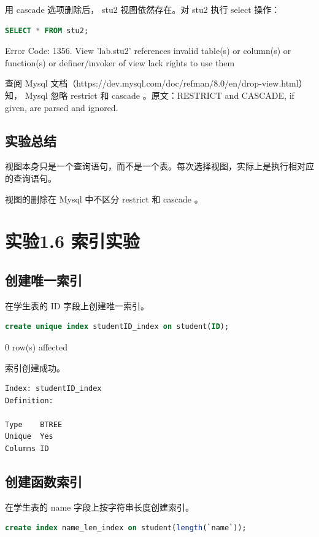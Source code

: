 \documentclass{article}
\begin{document}
用 cascade 选项删除后， stu2 视图依然存在。对 stu2 执行 select 操作：

\begin{lstlisting}[language=sql]
SELECT * FROM stu2;
\end{lstlisting}

Error Code: 1356. View 'lab.stu2' references invalid table(s) or column(s) or function(s) or definer/invoker of view lack rights to use them


查阅 Mysql 文档（https://dev.mysql.com/doc/refman/8.0/en/drop-view.html）知， Mysql 忽略 restrict 和 cascade 。原文：RESTRICT and CASCADE, if given, are parsed and ignored.

\subsection{实验总结}

视图本身只是一个查询语句，而不是一个表。每次选择视图，实际上是执行相对应的查询语句。

视图的删除在 Mysql 中不区分 restrict 和 cascade 。

\section{实验1.6 索引实验}

\subsection{创建唯一索引}

在学生表的 ID 字段上创建唯一索引。

\begin{lstlisting}[language=sql]
create unique index studentID_index on student(ID);
\end{lstlisting}

0 row(s) affected

索引创建成功。

\begin{lstlisting}
Index: studentID_index
Definition:

Type	BTREE
Unique	Yes
Columns	ID
\end{lstlisting}

\subsection{创建函数索引}

在学生表的 name 字段上按字符串长度创建索引。

\begin{lstlisting}[language=sql]
create index name_len_index on student(length(`name`));
\end{lstlisting}
\end{document}
